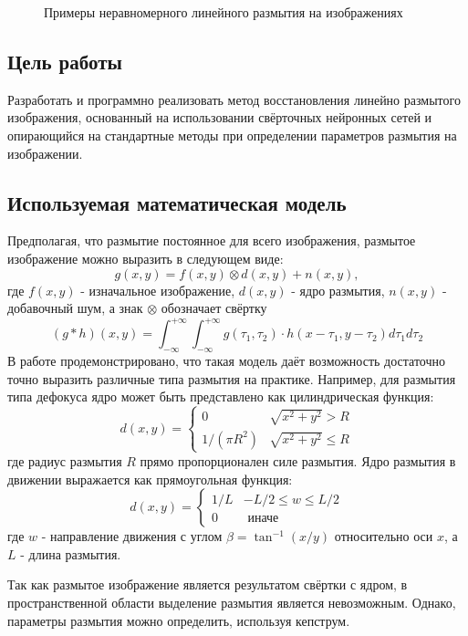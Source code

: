 \begin{figure}[h!]
\begin{subfigure}[b]{0.5\linewidth}
  \end{subfigure}
  \caption{Примеры неравномерного линейного размытия на изображениях}
  \label{fig:lblur}
\end{figure}

\subsection{Цель работы}
Разработать и программно реализовать метод восстановления линейно размытого изображения, основанный на использовании свёрточных нейронных сетей и опирающийся на стандартные методы при определении параметров размытия на изображении.


\subsection{Используемая математическая модель }
Предполагая, что размытие постоянное для всего изображения, 
размытое изображение можно выразить в следующем виде:
\begin{equation}
g(x, y)=f(x, y) \otimes d(x, y)+n(x, y),
\label{conv_formula}
\end{equation}
где $f(x,y)$ - изначальное изображение, $d(x, y)$ - ядро размытия, $n(x,y)$ - добавочный шум, а знак $\otimes$ обозначает свёртку $$(g * h)(x, y)=\int_{-\infty}^{+\infty} \int_{-\infty}^{+\infty} g\left(\tau_{1}, \tau_{2}\right) \cdot h\left(x-\tau_{1}, y-\tau_{2}\right) d \tau_{1} d \tau_{2}$$
В работе \cite{kopeika} продемонстрировано, что такая модель даёт возможность достаточно точно выразить различные типа размытия на практике. 
Например, для размытия типа дефокуса ядро может быть представлено как цилиндрическая функция:
\begin{equation}
d(x, y)=\left\{\begin{array}{ll}
0 & \sqrt{x^{2}+y^{2}}>R \\
1 /\left(\pi R^{2}\right) & \sqrt{x^{2}+y^{2}} \leq R
\end{array}\right.
\end{equation}
где радиус размытия $R$ прямо пропорционален силе размытия. 
Ядро размытия в движении выражается как прямоугольная функция:
\begin{equation}
d(x, y)=\left\{\begin{array}{ll}
1 / L & -L / 2 \leq w \leq L / 2 \\
0 & \text { иначе}
\end{array}\right.
\end{equation}
где $w$ - направление движения с углом $\beta=\tan ^{-1}(x / y)$  относительно оси $x$, 
а $L$ - длина размытия.
\par
Так как размытое изображение является результатом свёртки с ядром, в пространственной области выделение размытия является невозможным. Однако, параметры размытия можно определить, используя кепструм.

